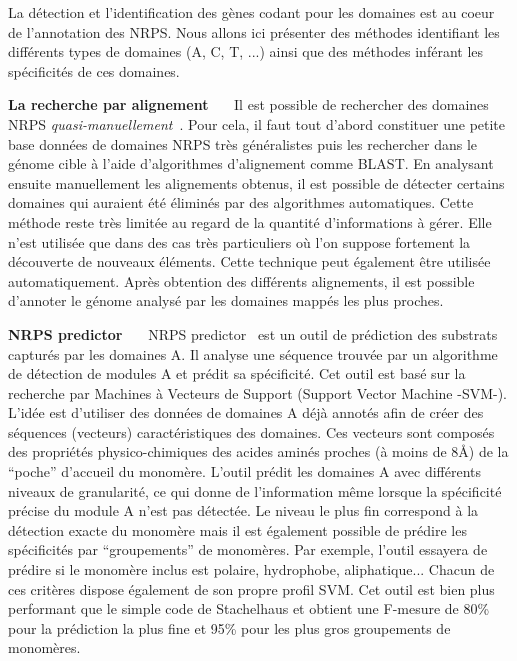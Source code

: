La détection et l'identification des gènes codant pour les domaines est au coeur de l'annotation des NRPS.
Nous allons ici présenter des méthodes identifiant les différents types de domaines (A, C, T, ...) ainsi que des méthodes inférant les spécificités de ces domaines.

\textbf{La recherche par alignement}~~~
Il est possible de rechercher des domaines NRPS \textit{quasi-manuellement}~\cite{bachmann_chapter_2009}.
Pour cela, il faut tout d'abord constituer une petite base données de domaines NRPS très généralistes puis les rechercher dans le génome cible à l'aide d'algorithmes d'alignement comme BLAST.
En analysant ensuite manuellement les alignements obtenus, il est possible de détecter certains domaines qui auraient été éliminés par des algorithmes automatiques.
Cette méthode reste très limitée au regard de la quantité d'informations à gérer.
Elle n'est utilisée que dans des cas très particuliers où l'on suppose fortement la découverte de nouveaux éléments.
Cette technique peut également être utilisée automatiquement.
Après obtention des différents alignements, il est possible d'annoter le génome analysé par les domaines mappés les plus proches.

\textbf{NRPS predictor}~~~
NRPS predictor~\cite{rottig_nrpspredictor2web_2011,rausch_specificity_2005} est un outil de prédiction des substrats capturés par les domaines A.
Il analyse une séquence trouvée par un algorithme de détection de modules A et prédit sa spécificité.
Cet outil est basé sur la recherche par Machines à Vecteurs de Support (Support Vector Machine -SVM-).
L'idée est d'utiliser des données de domaines A déjà annotés afin de créer des séquences (vecteurs) caractéristiques des domaines.
Ces vecteurs sont composés des propriétés physico-chimiques des acides aminés proches (à moins de 8Å) de la ``poche'' d'accueil du monomère.
L'outil prédit les domaines A avec différents niveaux de granularité, ce qui donne de l'information même lorsque la spécificité précise du module A n'est pas détectée.
Le niveau le plus fin correspond à la détection exacte du monomère mais il est également possible de prédire les spécificités par ``groupements'' de monomères.
Par exemple, l'outil essayera de prédire si le monomère inclus est polaire, hydrophobe, aliphatique...
Chacun de ces critères dispose également de son propre profil SVM.
Cet outil est bien plus performant que le simple code de Stachelhaus et obtient une F-mesure de 80\% pour la prédiction la plus fine et 95\% pour les plus gros groupements de monomères.


